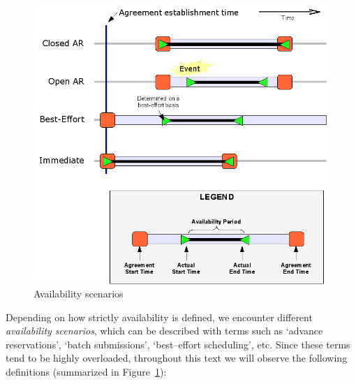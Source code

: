 \begin{figure}
  \begin{center}
    \includegraphics[width=\textwidth]{figures/availability.png}
    \caption{Availability scenarios}
    \label{fig:availability}
  \end{center}
\end{figure}

Depending on how strictly availability is defined, we encounter different \emph{availability scenarios}, which can be described with terms such as `advance reservations', `batch submissions', `best--effort scheduling', etc. Since these terms tend to be highly overloaded, throughout this text we will observe the following definitions (summarized in Figure~\ref{fig:availability}):


